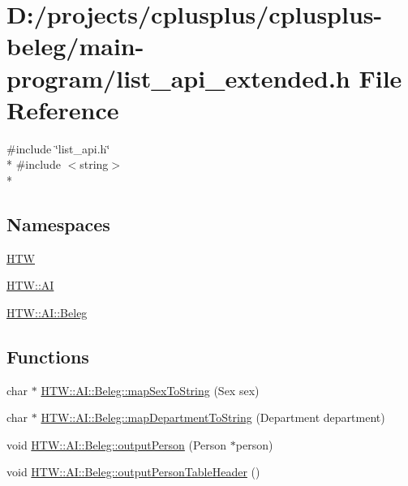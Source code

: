 \hypertarget{main-program_2list__api__extended_8h}{\section{D\-:/projects/cplusplus/cplusplus-\/beleg/main-\/program/list\-\_\-api\-\_\-extended.h File Reference}
\label{main-program_2list__api__extended_8h}
}
{\ttfamily \#include \char`\"{}list\-\_\-api.\-h\char`\"{}}\\*
{\ttfamily \#include $<$string$>$}\\*
\subsection*{Namespaces}
\begin{DoxyCompactItemize}
\item 
\hyperlink{namespace_h_t_w}{H\-T\-W}
\item 
\hyperlink{namespace_h_t_w_1_1_a_i}{H\-T\-W\-::\-A\-I}
\item 
\hyperlink{namespace_h_t_w_1_1_a_i_1_1_beleg}{H\-T\-W\-::\-A\-I\-::\-Beleg}
\end{DoxyCompactItemize}
\subsection*{Functions}
\begin{DoxyCompactItemize}
\item 
char $\ast$ \hyperlink{namespace_h_t_w_1_1_a_i_1_1_beleg_aa88237c539d44af6b297104e90f3fe4a}{H\-T\-W\-::\-A\-I\-::\-Beleg\-::map\-Sex\-To\-String} (Sex sex)
\item 
char $\ast$ \hyperlink{namespace_h_t_w_1_1_a_i_1_1_beleg_a71374c8885c328cc86695031048d6f3a}{H\-T\-W\-::\-A\-I\-::\-Beleg\-::map\-Department\-To\-String} (Department department)
\item 
void \hyperlink{namespace_h_t_w_1_1_a_i_1_1_beleg_a0079743a47110e2ebbf1d1c0adc88a4f}{H\-T\-W\-::\-A\-I\-::\-Beleg\-::output\-Person} (Person $\ast$person)
\item 
void \hyperlink{namespace_h_t_w_1_1_a_i_1_1_beleg_a4a69303afeacbd64a2185c148f7b1862}{H\-T\-W\-::\-A\-I\-::\-Beleg\-::output\-Person\-Table\-Header} ()
\end{DoxyCompactItemize}
